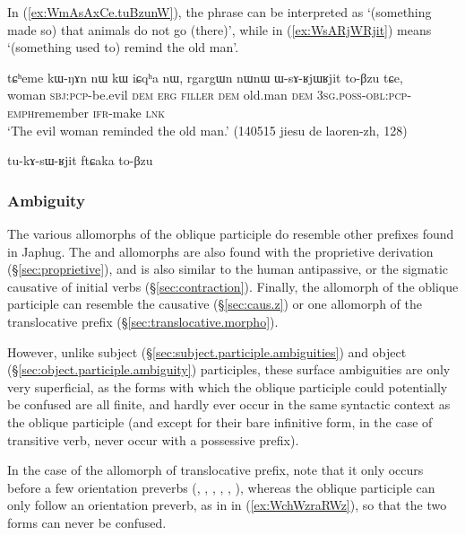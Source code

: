 In (\ref{ex:WmAsAxCe.tuBzunW}), the phrase  can be interpreted as `(something made so) that animals do not go (there)', while in (\ref{ex:WsARjWRjit})  means `(something used to) remind the old man'. 

\begin{exe}
\ex \label{ex:WsARjWRjit}
\gll tɕʰeme kɯ-ŋɤn nɯ kɯ iɕqʰa nɯ, rgargɯn nɯnɯ ɯ-sɤ-ʁjɯ\redp{}ʁjit to-βzu tɕe, \\
woman \textsc{sbj}:\textsc{pcp}-be.evil \textsc{dem} \textsc{erg} \textsc{filler} \textsc{dem} old.man \textsc{dem} \textsc{3sg}.\textsc{poss}-\textsc{obl}:\textsc{pcp}-\textsc{emph}\redp{}remember \textsc{ifr}-make \textsc{lnk} \\
\glt `The evil woman reminded the old man.' (140515 jiesu de laoren-zh, 128)
\end{exe}

tu-kɤ-sɯ-ʁjit ftɕaka to-βzu

\subsubsection{Ambiguity} \label{sec:oblique.participle.ambiguity}
The various allomorphs of the oblique participle do resemble other prefixes found in Japhug. The  and  allomorphs are also found with the proprietive derivation (§\ref{sec:proprietive}), and  is also similar to the human antipassive, or the sigmatic causative of  initial verbs (§\ref{sec:contraction}). Finally, the  allomorph of the oblique participle can resemble the causative (§\ref{sec:caus.z}) or one allomorph of the translocative prefix (§\ref{sec:translocative.morpho}).

However, unlike subject (§\ref{sec:subject.participle.ambiguities}) and object (§\ref{sec:object.participle.ambiguity}) participles, these surface ambiguities are only very superficial, as the forms with which the oblique participle could potentially be confused are all finite, and hardly ever occur in the same syntactic context as the oblique participle (and except for their bare infinitive form, in the case of transitive verb, never occur with a possessive prefix). 

In the case of the  allomorph of translocative prefix, note that it only occurs before a few orientation preverbs (, , , , , ), whereas the oblique participle  can only follow an orientation preverb, as in  in (\ref{ex:WchWzraRWz}), so that the two forms can never be confused.

